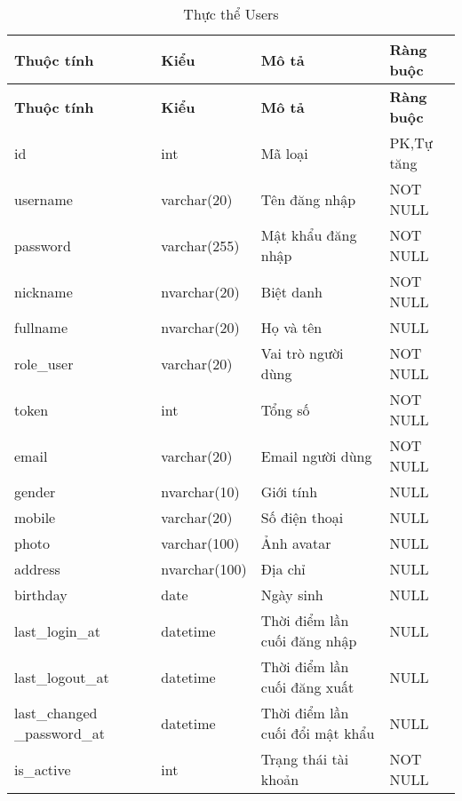 \begin{center}
\begin{longtabu} to 
\caption{Thực thể Users} \\
   \hline \textbf{Thuộc tính}  & \textbf{Kiểu} & \textbf{Mô tả} & \textbf{Ràng buộc} \\ \hline
   \endfirsthead
   \hline \textbf{Thuộc tính}  & \textbf{Kiểu} & \textbf{Mô tả} & \textbf{Ràng buộc} \\ \hline
   \endhead
      id & int  & Mã loại & PK,Tự tăng
      \\ \hline
      username & varchar(20) & Tên đăng nhập & NOT NULL 
      \\ \hline
      password & varchar(255) & Mật khẩu đăng nhập & NOT NULL
      \\ \hline
      nickname & nvarchar(20) & Biệt danh & NOT NULL
      \\ \hline
      fullname & nvarchar(20) & Họ và tên & NULL
      \\ \hline
      role\_user & varchar(20) & Vai trò người dùng& NOT NULL
      \\ \hline
      token & int & Tổng số  & NOT NULL
      \\ \hline
      email & varchar(20) & Email người dùng & NOT NULL
      \\ \hline
      gender & nvarchar(10) & Giới tính & NULL
      \\ \hline
      mobile & varchar(20) & Số điện thoại & NULL
      \\ \hline
      photo & varchar(100) & Ảnh avatar & NULL
      \\ \hline
      address & nvarchar(100) & Địa chỉ & NULL
      \\ \hline
      birthday & date & Ngày sinh & NULL
      \\ \hline
      last\_login\_at & datetime & Thời điểm lần cuối đăng nhập & NULL
      \\ \hline
      last\_logout\_at & datetime & Thời điểm lần cuối đăng xuất & NULL
      \\ \hline
      last\_changed \_password\_at & datetime & Thời điểm lần cuối đổi mật khẩu & NULL
      \\ \hline
      is\_active & int & Trạng thái tài khoản & NOT NULL
      \\ \hline
\end{longtabu}
\end{center}



